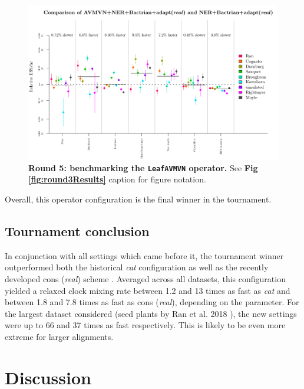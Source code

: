 \documentclass[10pt,letterpaper]{article}
\begin{document}
\begin{figure}[!h]
\includegraphics[width=\textwidth]{benchmarking/benchmarkingVM/ESS_round5.pdf}
\caption{\textbf{Round 5: benchmarking the \texttt{LeafAVMVN} operator.} See \textbf{Fig \ref{fig:round3Results}} caption for figure notation.  }
\label{fig:round5Results}
\end{figure}



Overall, this operator configuration is the final winner in the tournament. %



\subsection*{Tournament conclusion}
 In conjunction with all settings which came before it, the tournament winner  outperformed both the historical \textit{cat} configuration \cite{drummond2006relaxed} as well as the recently developed cons (\textit{real}) scheme \cite{zhang2020improving}.
Averaged across all datasets, this configuration yielded a relaxed clock  mixing rate between 1.2 and 13 times as fast as \textit{cat} and between 1.8 and 7.8 times as fast as cons (\textit{real}), depending on the parameter.
For the largest dataset considered (seed plants by Ran et al. 2018 \cite{Ran_2018}), the new settings were up to 66 and 37 times as fast respectively.
This is likely to be even more extreme for larger alignments.



\section*{Discussion} \label{sect:discussion}
\end{document}
